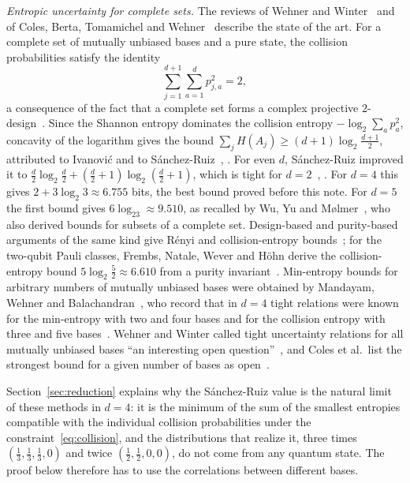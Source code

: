 \documentclass[11pt,a4paper]{article}
\theoremstyle{plain}
\begin{document}
\emph{Entropic uncertainty for complete sets.} The reviews of Wehner and
Winter~\cite{WW2010} and of Coles, Berta, Tomamichel and Wehner~\cite{CBTW2017}
describe the state of the art. For a complete set of mutually unbiased bases
and a pure state, the collision probabilities satisfy the identity
\begin{equation}\label{eq:collision}
  \sum_{j=1}^{d+1}\sum_{a=1}^{d}p_{j,a}^2=2,
\end{equation}
a consequence of the fact that a complete set forms a complex projective
$2$-design~\cite{BW2007,CBTW2017}. Since the Shannon entropy dominates the
collision entropy $-\log_2\sum_ap_a^2$, concavity of the logarithm gives the
bound $\sum_jH(A_j)\ge(d+1)\log_2\frac{d+1}{2}$, attributed to Ivanovi\'c and
to S\'anchez-Ruiz~\cite[Eq.~(6)]{WW2010}, \cite[Eq.~(81)]{CBTW2017}. For even
$d$, S\'anchez-Ruiz improved it to
$\frac d2\log_2\frac d2+(\frac d2+1)\log_2(\frac d2+1)$, which is tight for
$d=2$~\cite{WW2010}, \cite[Eq.~(86)]{CBTW2017}. For $d=4$ this gives
$2+3\log_2 3\approx 6.755$ bits, the best bound proved before this note. For
$d=5$ the first bound gives $6\log_23\approx 9.510$, as recalled by Wu, Yu and
M{\o}lmer~\cite[Eq.~(20)]{WYM2009}, who also derived bounds for subsets of a
complete set. Design-based and purity-based arguments of the same kind give
R\'enyi and collision-entropy bounds~\cite{KG2020,Howard2015,Frembs2026}; for the
two-qubit Pauli classes, Frembs, Natale, Wever and H\"ohn derive the
collision-entropy bound $5\log_2\frac52\approx6.610$ from a purity
invariant~\cite[Thm.~4]{Frembs2026}. Min-entropy bounds for arbitrary numbers
of mutually unbiased bases were obtained by Mandayam, Wehner and
Balachandran~\cite{MWB2010}, who record that in $d=4$ tight relations were
known for the min-entropy with two and four bases and for the collision
entropy with three and five bases~\cite[Sec.~I.C]{MWB2010}. Wehner and Winter
called tight uncertainty relations for all mutually unbiased bases ``an
interesting open question''~\cite[Sec.~III.B.2]{WW2010}, and Coles et al.\
list the strongest bound for a given number of bases as
open~\cite[App.~A]{CBTW2017}.

Section~\ref{sec:reduction} explains why the S\'anchez-Ruiz value is the
natural limit of these methods in $d=4$: it is the minimum of the sum of the
smallest entropies compatible with the individual collision probabilities under
the constraint~\eqref{eq:collision}, and the distributions that realize it,
three times $(\tfrac13,\tfrac13,\tfrac13,0)$ and twice $(\tfrac12,\tfrac12,0,0)$,
do not come from any quantum state. The proof below therefore has to use the
correlations between different bases.
\end{document}
